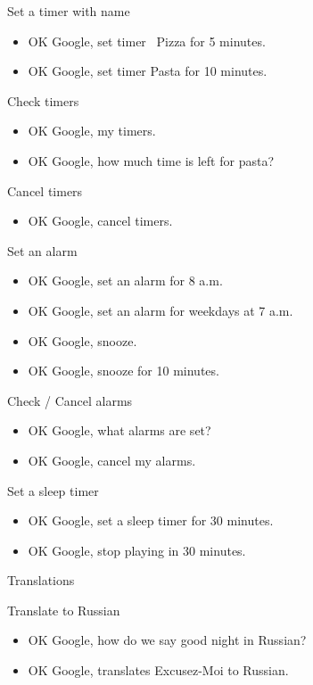 \documentclass[
  letterpaper,
  DIV=11,
  numbers=noendperiod]{scrartcl}
\providecommand{\tightlist}{%
  \setlength{\itemsep}{0pt}\setlength{\parskip}{0pt}}\usepackage{longtable,booktabs,array}
\begin{document}
Set a timer with name

\begin{itemize}
\item
  OK Google, set timer~ Pizza for 5 minutes.
\item
  OK Google, set timer Pasta for 10 minutes.
\end{itemize}

Check timers

\begin{itemize}
\item
  OK Google, my timers.
\item
  OK Google, how much time is left for pasta?
\end{itemize}

Cancel timers

\begin{itemize}
\tightlist
\item
  OK Google, cancel timers.
\end{itemize}

Set an alarm

\begin{itemize}
\item
  OK Google, set an alarm for 8 a.m.
\item
  OK Google, set an alarm for weekdays at 7 a.m.
\item
  OK Google, snooze.
\item
  OK Google, snooze for 10 minutes.
\end{itemize}

Check / Cancel alarms

\begin{itemize}
\item
  OK Google, what alarms are set?
\item
  OK Google, cancel my alarms.
\end{itemize}

Set a sleep timer

\begin{itemize}
\item
  OK Google, set a sleep timer for 30 minutes.
\item
  OK Google, stop playing in 30 minutes.
\end{itemize}

Translations

Translate to Russian

\begin{itemize}
\item
  OK Google, how do we say good night in Russian?
\item
  OK Google, translates Excusez-Moi to Russian.
\end{itemize}
\end{document}
